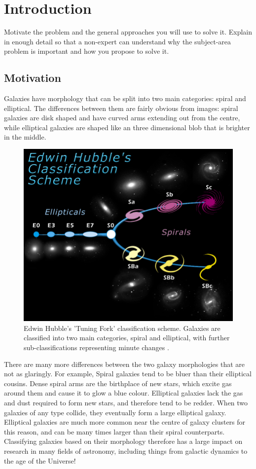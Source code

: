 \section{Introduction}
\label{sec:intro}
Motivate the problem and the general approaches you will use to solve it. Explain in enough detail so that a non-expert can understand why the subject-area problem is important and how you propose to solve it.

\subsection{Motivation}
Galaxies have morphology that can be split into two main categories: spiral and elliptical. 
The differences between them are fairly obvious from images: spiral galaxies are disk shaped and have curved arms extending out from the centre, while elliptical galaxies are shaped like an three dimensional blob that is brighter in the middle. 

\begin{figure}[h]
	\centering
	\captionsetup{justification=centering}
	\includegraphics[scale=0.7]{Figures/TuningFork.jpg}
	\caption{Edwin Hubble's 'Tuning Fork' classification scheme. Galaxies are classified into two main categories, spiral and elliptical, with further sub-classifications representing minute changes \cite{TuningFork}.}
	\label{fig:tuningfork}
\end{figure}


There are many more differences between the two galaxy morphologies that are not as glaringly.  
For example, Spiral galaxies tend to be bluer than their elliptical cousins. 
Dense spiral arms are the birthplace of new stars, which excite gas around them and cause it to glow a blue colour. 
Elliptical galaxies lack the gas and dust required to form new stars, and therefore tend to be redder. 
When two galaxies of any type collide, they eventually form a large elliptical galaxy. 
Elliptical galaxies are much more common near the centre of galaxy clusters for this reason, and can be many times larger than their spiral counterparts.
Classifying galaxies based on their morphology therefore has a large impact on research in many fields of astronomy, including things from galactic dynamics to the age of the Universe!

